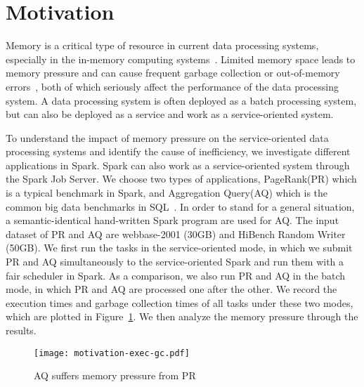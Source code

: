 \section{Motivation}
\label{sec:motivation}

Memory is a critical type of resource in current data processing systems, especially in the in-memory computing systems~\cite{shi:mammoth}. Limited memory space leads to memory pressure and can cause frequent garbage collection or out-of-memory errors~\cite{fang2015interruptible}, both of which seriously affect the performance of the data processing system. A data processing system is often deployed as a batch processing system, but can also be deployed as a service and work as a service-oriented system. 

To understand the impact of memory pressure on the service-oriented data processing systems and identify the cause of inefficiency, we investigate different applications in Spark. Spark can also work as a service-oriented system through the Spark Job Server. We choose two types of applications, PageRank(PR)  which is a typical benchmark in Spark, and Aggregation Query(AQ) which is the common big data benchmarks in SQL~\cite{www:benchmark}. In order to stand for a general situation, a semantic-identical hand-written Spark program are used for AQ. The input dataset of PR and AQ are webbase-2001 (30GB) and HiBench Random Writer (50GB).  We first run the tasks in the service-oriented mode, in which we submit PR and AQ simultaneously to the service-oriented Spark and run them with a fair scheduler in Spark. As a comparison, we also run PR and AQ in the batch mode, in which PR and AQ are processed one after the other. We record the execution times and garbage collection times of all tasks under these two modes, which are plotted in Figure~\ref{fig:memorypressure}. We then analyze the  memory pressure through the results.   

\begin{figure}[!t]
\centering
\texttt{[image: motivation-exec-gc.pdf]}
\vspace{-2mm}
\caption{AQ suffers memory pressure from PR}
\vspace{-6mm}
\label{fig:memorypressure}
\end{figure}

